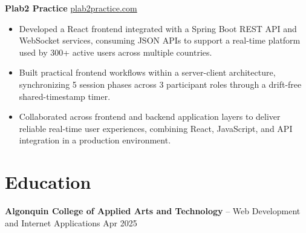 \documentclass[11pt]{article}       %
\begin{document}
\textbf{Plab2 Practice} \hfill \href{https://plab2practice.com}{plab2practice.com} \\
\vspace{-9pt}
\begin{itemize}
  \item Developed a React frontend integrated with a Spring Boot REST API and WebSocket services, consuming JSON APIs to support a real-time platform used by 300+ active users across multiple countries.
  \item Built practical frontend workflows within a server-client architecture, synchronizing 5 session phases across 3 participant roles through a drift-free shared-timestamp timer.
  \item Collaborated across frontend and backend application layers to deliver reliable real-time user experiences, combining React, JavaScript, and API integration in a production environment.
\end{itemize}





\section*{Education}
\textbf{Algonquin College of Applied Arts and Technology} -- Web Development and Internet Applications
\hfill Apr 2025 \\
\end{document}
